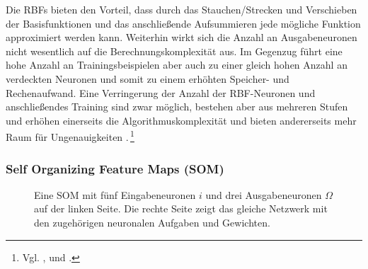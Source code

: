 Die RBFs bieten den Vorteil, dass durch das Stauchen/Strecken und Verschieben der Basisfunktionen und das anschließende Aufsummieren jede mögliche Funktion approximiert werden kann. Weiterhin wirkt sich die Anzahl an Ausgabeneuronen nicht wesentlich auf die Berechnungskomplexität aus. Im Gegenzug führt eine hohe Anzahl an Trainingsbeispielen aber auch zu einer gleich hohen Anzahl an verdeckten Neuronen und somit zu einem erhöhten Speicher- und Rechenaufwand. Eine Verringerung der Anzahl der RBF-Neuronen und anschließendes Training sind zwar möglich, bestehen aber aus mehreren Stufen und erhöhen einerseits die Algorithmuskomplexität und bieten andererseits mehr Raum für Ungenauigkeiten .\,\footnote{Vgl. \citet[73 ff]{comp_int_07}, \citet[109 ff]{dkriesel07} und \citet[261 ff]{Kroll16}.}

\subsubsection{Self Organizing Feature Maps (SOM)}
\begin{figure}[!htb]
    \centering
        
    \caption[Darstellung eines SOM]{Eine SOM mit fünf Eingabeneuronen $i$ und drei Ausgabeneuronen $\Omega$ auf der linken Seite. Die rechte Seite zeigt das gleiche Netzwerk mit den zugehörigen neuronalen Aufgaben und Gewichten.}
    \label{fig:SOM}
\end{figure}

